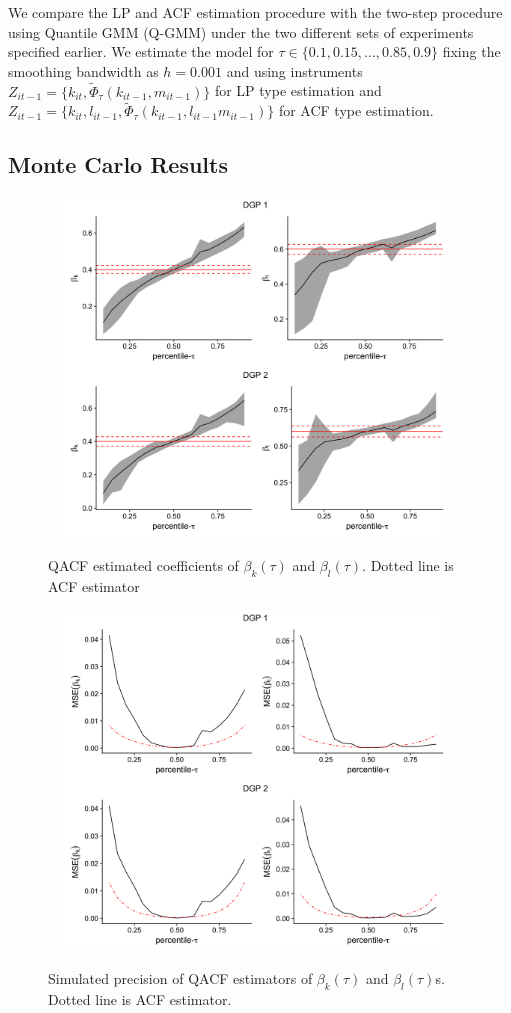 \documentclass[11pt]{article}
\begin{document}
We compare the LP and ACF estimation procedure with the two-step procedure using Quantile GMM (Q-GMM) under  the two different sets of experiments specified earlier. We estimate the model for $\tau\in\{0.1, 0.15, \dots, 0.85, 0.9\}$ fixing the smoothing bandwidth as $h=0.001$ and using instruments $Z_{it-1}=\{k_{it}, \tilde{\Phi}_{\tau}(k_{it-1}, m_{it-1})\}$ for LP type estimation and $Z_{it-1}=\{k_{it}, l_{it-1}, \tilde{\Phi}_{\tau}(k_{it-1}, l_{it-1} m_{it-1})\}$ for ACF type estimation.
 

\subsection{Monte Carlo Results}

\begin{figure}[H]
\centering
\caption{QACF estimated coefficients of  $\beta_{k}(\tau)$ and $\beta_{l}(\tau)$. Dotted line is ACF estimator}
\includegraphics[width=11cm, height=9cm]{ACF_Coefficient_Plot.png}
\label{ACF_coefficient_plot}
\end{figure}

\begin{figure}[H]
\centering
\caption{Simulated precision of QACF estimators of $\beta_{k}(\tau)$ and $\beta_{l}(\tau)$s. Dotted line is ACF estimator.}
\includegraphics[width=11cm, height=9cm]{ACF_MSE_Plot.png}
\label{MSE_plot}
\end{figure}
\end{document}
